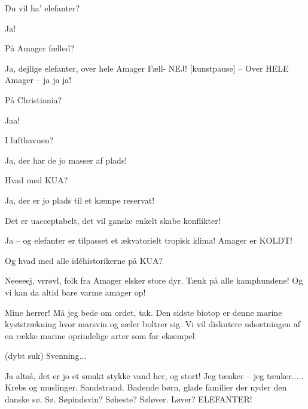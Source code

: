 \documentclass[a4paper,12pt]{article}
\begin{document}
\begin{sketch}
 Du vil ha' elefanter?

 Ja!

 På Amager fælled?

 Ja, dejlige elefanter, over hele Amager Fæll- NEJ! [kunstpause] -- Over HELE Amager -- ja ja ja! 

 På Christiania?

 Jaa!

 I lufthavnen?

 Ja, der har de jo masser af plads!

 Hvad med KUA?

 Ja, der er jo plads til et kæmpe reservat!

 Det er uacceptabelt, det vil ganske enkelt skabe konflikter!

 Ja -- og elefanter er tilpasset et ækvatorielt tropisk klima! Amager er KOLDT!

 Og hvad med alle idéhistorikerne på KUA?

 Neeeeej, vrrøvl, folk fra Amager elsker store dyr. Tænk på alle kamphundene! Og vi kan da altid bare varme amager op!

 Mine herrer! Må jeg bede om ordet, tak. Den sidste biotop er denne marine kyststrækning hvor marsvin og sæler boltrer sig. Vi vil diskutere udsætningen af en række marine oprindelige arter som for eksempel


 (dybt suk) Svenning...

 Ja altså, det er jo et smukt stykke vand her, og stort! Jeg tænker -- jeg tænker..... Krebs og muslinger. Sandstrand. Badende børn, glade familier der nyder den danske sø. Sø. Søpindsvin? Søheste? Søløver. Løver? ELEFANTER!



\end{sketch}
\end{document}

